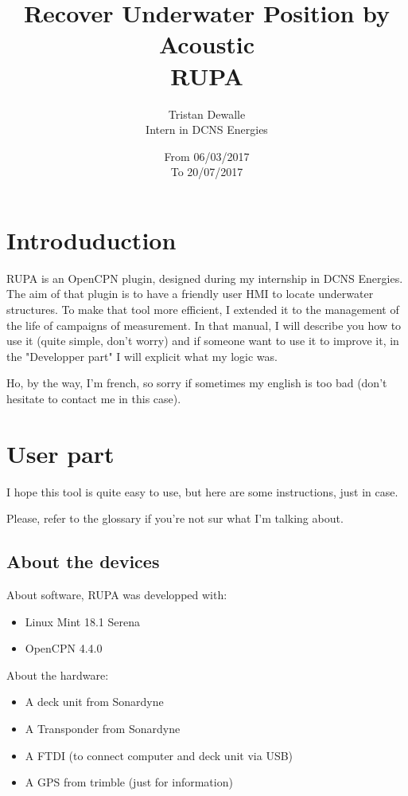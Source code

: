 \documentclass[11pt]{report}
\title{Recover Underwater Position by Acoustic \\ RUPA}
\author{Tristan Dewalle \\ Intern in DCNS Energies}
\date{From 06/03/2017\\To 20/07/2017}
\begin{document}
    \maketitle
	\tableofcontents
	\chapter{Introduduction}
	 RUPA is an OpenCPN plugin, designed during my internship in DCNS Energies. The aim of that plugin is to 
	 have a friendly user HMI to locate underwater structures. To make that tool more efficient, I extended it 
	 to the management of the life of campaigns of measurement. In that manual, I will describe you how to use it
	 (quite simple, don't worry) and if someone want to use it to improve it, in the "Developper part" I will 
	 explicit what my logic was.

	 Ho, by the way, I'm french, so sorry if sometimes my english is too bad (don't hesitate to contact me in this case).
	\chapter{User part}
	    I hope this tool is quite easy to use, but here are some instructions, just in case.

	    Please, refer to the glossary if you're not sur what I'm talking about.
	    \section{About the devices }
		About software, RUPA was developped with:
		\begin{itemize}
		    \item Linux Mint 18.1 Serena
		    \item OpenCPN 4.4.0
		\end{itemize}

		 About the hardware: 
		\begin{itemize}
		    \item A deck unit from Sonardyne
		    \item A Transponder from Sonardyne
		    \item A FTDI (to connect computer and deck unit via USB)
		    \item A GPS from trimble (just for information)
		\end{itemize}
\end{document}
